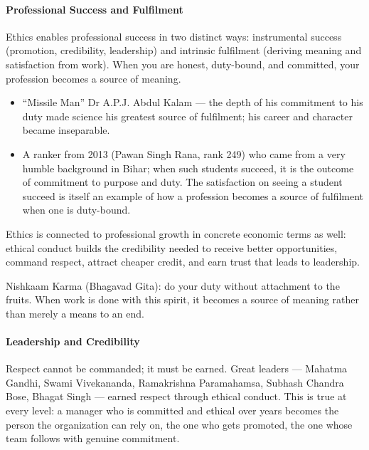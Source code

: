 \paragraph{Professional Success and Fulfilment} Ethics enables professional success in two distinct ways: instrumental success (promotion, credibility, leadership) and intrinsic fulfilment (deriving meaning and satisfaction from work). When you are honest, duty-bound, and committed, your profession becomes a source of meaning.

\begin{ExampleBox}
\begin{itemize}
\item ``Missile Man'' Dr A.P.J. Abdul Kalam --- the depth of his commitment to his duty made science his greatest source of fulfilment; his career and character became inseparable.
\item A ranker from 2013 (Pawan Singh Rana, rank 249) who came from a very humble background in Bihar; when such students succeed, it is the outcome of commitment to purpose and duty. The satisfaction on seeing a student succeed is itself an example of how a profession becomes a source of fulfilment when one is duty-bound.
\end{itemize}
\end{ExampleBox}

Ethics is connected to professional growth in concrete economic terms as well: ethical conduct builds the credibility needed to receive better opportunities, command respect, attract cheaper credit, and earn trust that leads to leadership.

\begin{KeyConcept}
Nishkaam Karma (Bhagavad Gita): do your duty without attachment to the fruits. When work is done with this spirit, it becomes a source of meaning rather than merely a means to an end.
\end{KeyConcept}

\paragraph{Leadership and Credibility} Respect cannot be commanded; it must be earned. Great leaders --- Mahatma Gandhi, Swami Vivekananda, Ramakrishna Paramahamsa, Subhash Chandra Bose, Bhagat Singh --- earned respect through ethical conduct. This is true at every level: a manager who is committed and ethical over years becomes the person the organization can rely on, the one who gets promoted, the one whose team follows with genuine commitment.

